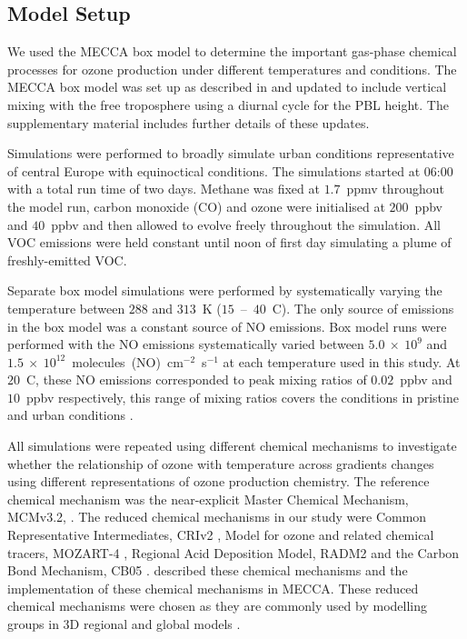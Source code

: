 \subsection{Model Setup} \label{ss:model_setup}
We used the MECCA box model to determine the important gas-phase chemical processes for ozone production under different temperatures and  conditions.
The MECCA box model was set up as described in \citet{Coates:2015} and updated to include vertical mixing with the free troposphere using a diurnal cycle for the PBL height.
The supplementary material includes further details of these updates.

Simulations were performed to broadly simulate urban conditions representative of central Europe with equinoctical conditions.
The simulations started at 06:00 with a total run time of two days.
Methane was fixed at $1.7$~ppmv throughout the model run, carbon monoxide (CO) and ozone were initialised at $200$~ppbv and $40$~ppbv and then allowed to evolve freely throughout the simulation.
All VOC emissions were held constant until noon of first day simulating a plume of freshly-emitted VOC.

Separate box model simulations were performed by systematically varying the temperature between $288$ and $313$~K ($15$~--~$40$~\degree C). 
The only source of  emissions in the box model was a constant source of NO emissions. 
Box model runs were performed with the NO emissions systematically varied between $5.0~\times~10^9$ and $1.5~\times~10^{12}$~molecules~(NO)~cm$^{-2}$~s$^{-1}$ at each temperature used in this study.
At $20$~\degree C, these NO emissions corresponded to peak  mixing ratios of $0.02$~ppbv and $10$~ppbv respectively, this range of  mixing ratios covers the  conditions in pristine and urban conditions \citep{vonSchneidemesser:2015}.

All simulations were repeated using different chemical mechanisms to investigate whether the relationship of ozone with temperature across  gradients changes using different representations of ozone production chemistry.
The reference chemical mechanism was the near-explicit Master Chemical Mechanism, MCMv3.2, \citep{Jenkin:1997, Jenkin:2003, Saunders:2003, MCM_Site}.
The reduced chemical mechanisms in our study were Common Representative Intermediates, CRIv2 \citep{Jenkin:2008}, Model for ozone and related chemical tracers, MOZART-4 \citep{Emmons:2010}, Regional Acid Deposition Model, RADM2 \citep{Stockwell:1990} and the Carbon Bond Mechanism, CB05 \citep{Yarwood:2005}. 
\citet{Coates:2015} described these chemical mechanisms and the implementation of these chemical mechanisms in MECCA.
These reduced chemical mechanisms were chosen as they are commonly used by modelling groups in 3D regional and global models \citep{Baklanov:2014}.

